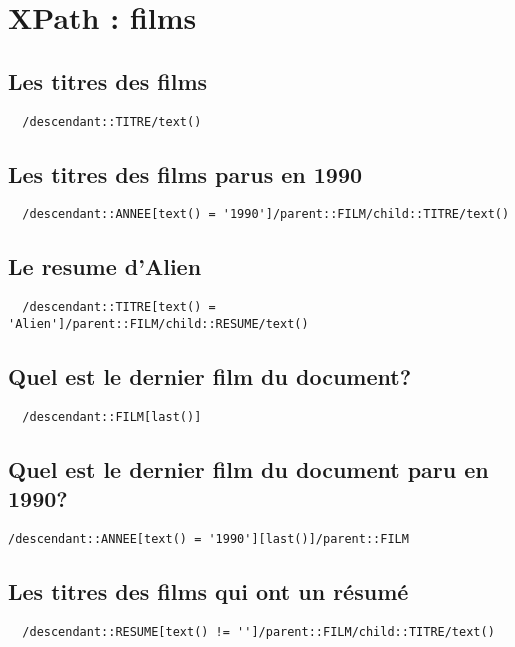 \chapter{XPath : films}
\section{Les titres des films}
\begin{verbatim}
  /descendant::TITRE/text()
\end{verbatim}

\section{Les titres des films parus en 1990}
\begin{verbatim}
  /descendant::ANNEE[text() = '1990']/parent::FILM/child::TITRE/text()
\end{verbatim}

\section{Le resume d'Alien}
\begin{verbatim}
  /descendant::TITRE[text() = 'Alien']/parent::FILM/child::RESUME/text()
\end{verbatim}

\section{Quel est le dernier film du document?}
\begin{verbatim}
  /descendant::FILM[last()]
\end{verbatim}

\section{Quel est le dernier film du document paru en 1990?}
\begin{verbatim}
/descendant::ANNEE[text() = '1990'][last()]/parent::FILM
\end{verbatim}

\section{Les titres des films qui ont un résumé}
\begin{verbatim}
  /descendant::RESUME[text() != '']/parent::FILM/child::TITRE/text()
\end{verbatim}

